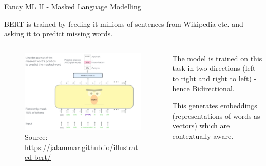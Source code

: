 \documentclass[9pt]{beamer}
\begin{document}
\begin{frame}{Fancy ML II - Masked Language Modelling}

BERT is trained by feeding it millions of sentences from Wikipedia etc. and asking it to predict missing words.

\begin{columns}
	\begin{column}{0.618\linewidth}
		\begin{figure}
			\includegraphics[width=\linewidth]{images/BERT-language-modeling-masked-lm.png}
			\caption{Source: \url{https://jalammar.github.io/illustrated-bert/}}
		\end{figure}
	\end{column}
	\begin{column}{0.382\linewidth}
		The model is trained on this task in two directions (left to right and right to left) - hence Bidirectional.
		
		\medskip
		
		This generates embeddings (representations of words as vectors) which are contextually aware.
	\end{column}
\end{columns}

\end{frame}
\end{document}
